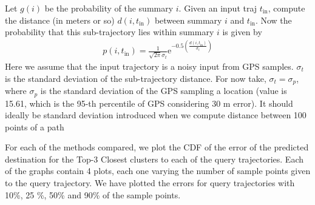 Let $g(i)$ be the probability of the summary $i$. Given an input traj $t_{\operatorname{in}}$, compute the distance (in meters or so) $d(i,t_{\operatorname{in}})$ between summary $i$ and $t_{\operatorname{in}}$. Now the probability that this sub-trajectory lies within summary $i$ is given by
\begin{eqnarray}
p(i,t_{\operatorname{in}}) = \frac{1}{\sqrt{2 \pi} \sigma_{t}} \mathrm{e}^{-0.5 \left( \frac{d(i,t_{\operatorname{in}})}{\sigma_{t}} \right)}
\end{eqnarray}
Here we assume that the input trajectory is a noisy input from GPS samples. $\sigma_{t}$ is the standard deviation of the sub-trajectory distance. For now take, $\sigma_{t} = \sigma_{p}$, where $\sigma_{p}$ is the standard deviation of the GPS sampling a location (value is 15.61, which is the 95-th percentile of GPS considering 30 m error). It should ideally be standard deviation introduced when we compute distance between 100 points of a path

For each of the methods compared, we plot the CDF of the error of the predicted destination for the Top-3 Closest clusters to each of the query trajectories. Each of the graphs contain 4 plots, each one varying the number of sample points given to the query trajectory. We have plotted the errors for query trajectories with 10\%, 25 \%, 50\% and 90\% of the sample points. 

